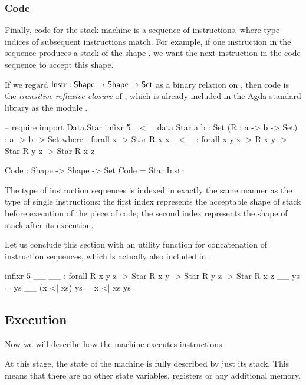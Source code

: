 \subsubsection{Code}

Finally, code for the stack machine is a sequence of instructions, where
type indices of subsequent instructions match. For example, if one instruction
in the sequence produces a stack of the shape ,
we want the next instruction in the code sequence to accept this shape.

If we regard
$\mathsf{Instr} : \mathsf{Shape} \to \mathsf{Shape} \to \mathsf{Set}$
as a binary relation on , then code is the \emph{transitive reflexive closure}
of , which is already included in the Agda standard library as the
module .

\begin{code}
  -- require import Data.Star
  infixr 5 _<|_
  data Star {a b : Set} (R : a -> b -> Set) : a -> b -> Set where
    \nil : forall {x} -> Star R x x
    _<|_ : forall {x y z} -> R x y -> Star R y z -> Star R x z

  Code : Shape -> Shape -> Set
  Code = Star Instr
\end{code}

\noindent The type of instruction sequences is indexed in exactly the same
manner as the type of single instructions: the first index represents the
acceptable shape of stack before execution of the piece of code; the second
index represents the shape of stack after its execution.

Let us conclude this section with an utility function for concatenation of
instruction sequences, which is actually also included in .

\begin{code}
  infixr 5 _\app_
  _\app_ : forall {R x y z} -> Star R x y -> Star R y z -> Star R x z
  _\app_ \nil ys = ys
  _\app_ (x <| xs) ys = x <| xs \app ys
\end{code}

\subsection{Execution}

Now we will describe how the machine executes instructions.

At this stage, the state of the machine is fully described by just its stack. This
means that there are no other state variables, registers or any additional
memory.

